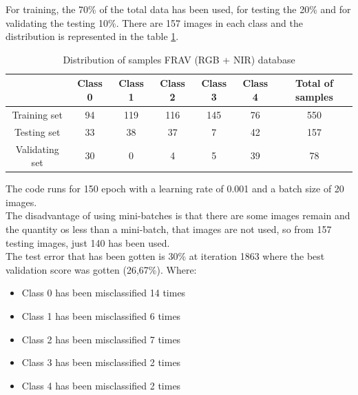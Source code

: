 For training, the 70\% of the total data has been used, for testing the 20\% and for validating the testing 10\%. There are 157 images in each class and the distribution is represented in the table \ref{FRAV_distribution1}.\\

\begin{table}[]
\centering
\label{FRAV_distribution1}
\begin{tabular}{c|ccccc|c|}
\cline{2-7}
                                     & \multicolumn{1}{c|}{Class 0} & \multicolumn{1}{c|}{Class 1} & \multicolumn{1}{c|}{Class 2} & \multicolumn{1}{c|}{Class 3} & Class 4 & Total of samples \\ \hline
\multicolumn{1}{|c|}{Training set}  & 94                           & 119                          & 116                          & 145                          & 76      & 550              \\ \cline{1-1}
\multicolumn{1}{|c|}{Testing set}    & 33                           & 38                           & 37                           & 7                            & 42      & 157              \\ \cline{1-1}
\multicolumn{1}{|c|}{Validating set} & 30                           & 0                            & 4                            & 5                            & 39      & 78               \\ \hline
\end{tabular} \caption{Distribution of samples FRAV (RGB + NIR) database}

\end{table}

The code runs for 150 epoch with a learning rate of 0.001 and a batch size of 20 images.\\

The disadvantage of using mini-batches is that there are some images remain and the quantity os less than a mini-batch, that images are not used, so from 157 testing images, just 140 has been used.\\

The test error that has been gotten is 30\% at iteration 1863 where the best validation score was gotten (26,67\%). Where:

\begin{itemize}
\item Class 0 has been misclassified  14 times
\item Class 1 has been misclassified  6 times
\item Class 2 has been misclassified  7 times
\item Class 3 has been misclassified  2 times
\item Class 4 has been misclassified  2 times
\end{itemize}

